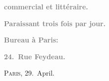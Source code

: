 \pstart
           \begin{otherlanguage}{french}\textcolor{gray}{\textbf{commercial et littéraire.}}\end{otherlanguage}\pend
           
\pstart
           \begin{otherlanguage}{french}\textcolor{gray}{\textbf{\textbf{Paraissant trois fois par jour.}}}\end{otherlanguage}\pend
           
\pstart
           \begin{otherlanguage}{french}\textcolor{gray}{\textbf{\textbf{Bureau à Paris:}}}\end{otherlanguage}\pend
           
\pstart
           \begin{otherlanguage}{french}\textcolor{gray}{\textbf{\textbf{24. Rue Feydeau.}}}\end{otherlanguage}\hfill \textsc{Paris}, 29. April.\pend
           
